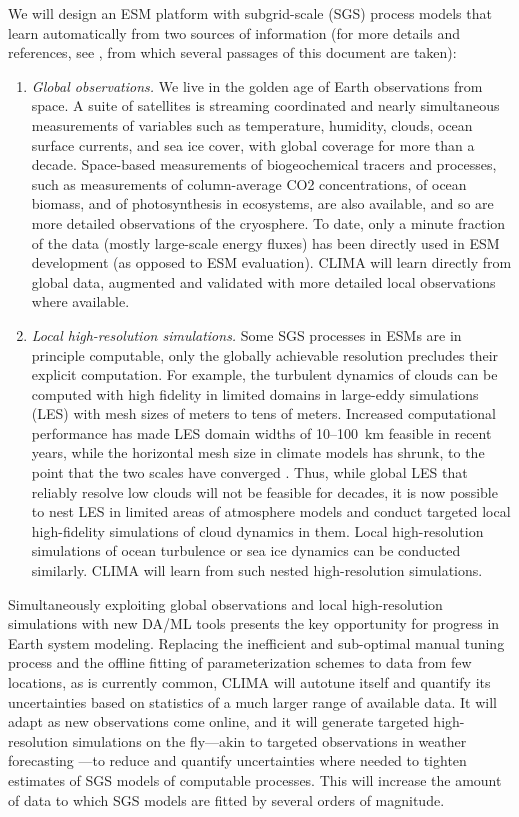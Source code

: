 \documentclass{article}
\begin{document}
We will design an ESM platform with subgrid-scale (SGS) process models that learn automatically from two sources of information (for more details and references, see \citet{Schneider17c}, from which several passages of this document are taken):
\begin{enumerate}
    \item \emph{Global observations.} We live in the golden age of Earth observations from space. A suite of satellites is streaming coordinated and nearly simultaneous measurements of variables such as temperature, humidity, clouds, ocean surface currents, and sea ice cover, with global coverage for more than a decade. Space-based measurements of biogeochemical tracers and processes, such as measurements of column-average CO2 concentrations, of ocean biomass, and of photosynthesis in ecosystems, are also available, and so are more detailed observations of the cryosphere. To date, only a minute fraction of the data (mostly large-scale energy fluxes) has been directly used in ESM development (as opposed to ESM evaluation). CLIMA will learn directly from global data, augmented and validated with more detailed local observations where available.
    \item \emph{Local high-resolution simulations.} Some SGS processes in ESMs are in principle computable, only the globally achievable resolution precludes their explicit computation. For example, the turbulent dynamics of clouds can be computed with high fidelity in limited domains in large-eddy simulations (LES) with mesh sizes of meters to tens of meters. Increased computational performance has made LES domain widths of 10--100~km feasible in recent years, while the horizontal mesh size in climate models has shrunk, to the point that the two scales have converged \citep{Schneider17a}. Thus, while global LES that reliably resolve low clouds will not be feasible for decades, it is now possible to nest LES in limited areas of atmosphere models and conduct targeted local high-fidelity simulations of cloud dynamics in them. Local high-resolution simulations of ocean turbulence or sea ice dynamics can be conducted similarly. CLIMA will learn from such nested high-resolution simulations.
\end{enumerate}
Simultaneously exploiting global observations and local high-resolution simulations with new DA/ML tools presents the key opportunity for  progress in Earth system modeling. Replacing the inefficient and sub-optimal manual tuning process and the offline fitting of parameterization schemes to data from few locations, as is currently common, CLIMA will autotune itself and quantify its uncertainties based on statistics of a much larger range of available data. It will adapt as new observations come online, and it will generate targeted high-resolution simulations on the fly---akin to targeted observations in weather forecasting \citep{Palmer98a,Lorenz98a}---to reduce and quantify uncertainties where needed to tighten estimates of SGS models of computable processes. This will increase the amount of data to which SGS models are fitted by several orders of magnitude.
\end{document}

